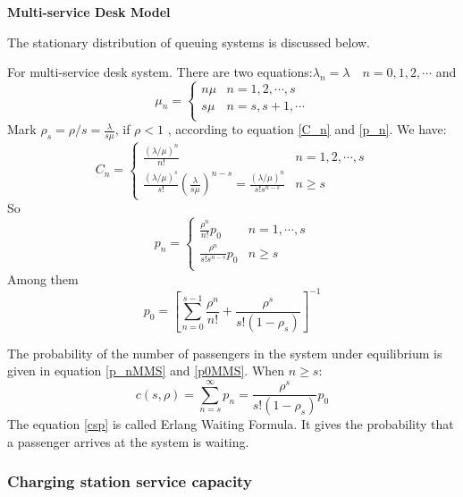 \documentclass{mcmthesis}
\begin{document}
\textbf{Multi-service Desk Model}

\par The stationary distribution of queuing systems is discussed below.

\par  For multi-service desk system. There are two equations:$\lambda_n = \lambda \quad n = 0,1,2,\cdots$
and 
$$\mu_n=
\begin{cases}
n\mu & \text{$n = 1, 2,\cdots,s$}\\
s\mu & \text{$n = s, s+1,\cdots$}\\
\end{cases}$$
Mark $\rho_s = \rho/s = \frac{\lambda}{s\mu}$, if $\rho < 1$ , according to equation \ref{C_n} and \ref{p_n}. We have:
\begin{equation}
	C_n = 
	\begin{cases}
		\frac{(\lambda / \mu)^n}{n!} & \text{$n = 1, 2,\cdots,s$}\\
		\frac{(\lambda / \mu)^s}{s!}\left(\frac{\lambda}{s\mu}\right)^{n-s} = \frac{(\lambda / \mu)^n}{s!s^{n-s}} & \text{$n \geqslant s$} \label{C_nMMS}
	\end{cases} 
\end{equation}
So 
\begin{equation}
	p_n = 
	\begin{cases}
		\frac{\rho^n}{n!}p_0  & \text{$n = 1, \cdots, s$}\\
		\frac{\rho^n}{s!s^{n-s}}p_0 & \text{$n \geqslant s$}\\
	\end{cases}
	\label{p_nMMS}
\end{equation}
Among them
\begin{equation}
	p_0 = \left[ \sum \limits_{n=0}^{s-1} \frac{\rho^n}{n!} + \frac{\rho^s}{s!(1-\rho_s)} \right]^{-1} \label{p0MMS}
\end{equation}
\par The probability of the number of passengers in the system under equilibrium is given in equation \ref{p_nMMS} and \ref{p0MMS}. When $n \geqslant s$:
\begin{equation}
	c(s,\rho) = \sum \limits_{n = s}^\infty p_n = \frac{\rho^s}{s!(1-\rho_s)}p_0 \label{csp}
\end{equation}
The equation \ref{csp} is called Erlang Waiting Formula. It gives the probability that a passenger arrives at the system is waiting.


\subsubsection*{Charging station service capacity}
\end{document}
